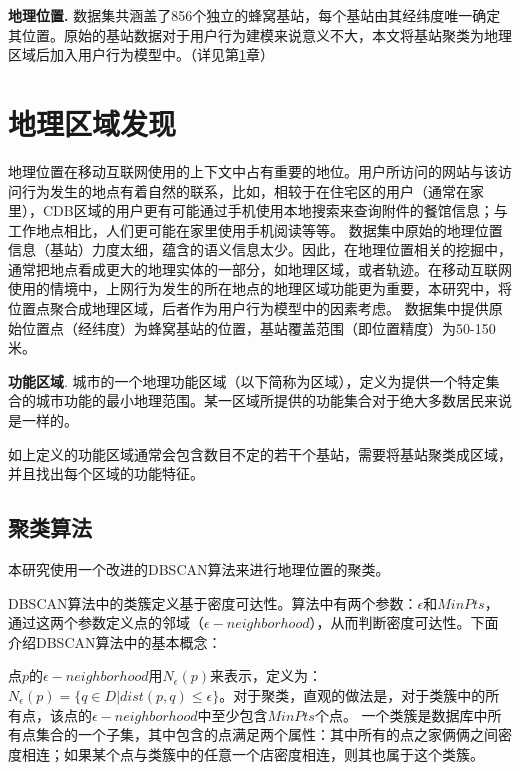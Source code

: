 \textbf{地理位置.} 数据集共涵盖了856个独立的蜂窝基站，每个基站由其经纬度唯一确定其位置。原始的基站数据对于用户行为建模来说意义不大，本文将基站聚类为地理区域后加入用户行为模型中。（详见第\ref{interest:sec:region}章）


\section{地理区域发现}
\label{interest:sec:region}
地理位置在移动互联网使用的上下文中占有重要的地位。用户所访问的网站与该访问行为发生的地点有着自然的联系，比如，相较于在住宅区的用户（通常在家里），CDB区域的用户更有可能通过手机使用本地搜索来查询附件的餐馆信息；与工作地点相比，人们更可能在家里使用手机阅读等等。
数据集中原始的地理位置信息（基站）力度太细，蕴含的语义信息太少。因此，在地理位置相关的挖掘中，通常把地点看成更大的地理实体的一部分，如地理区域\cite{env07park}，或者轨迹\cite{www10zheng}\cite{debu10zheng}。在移动互联网使用的情境中，上网行为发生的所在地点的地理区域功能更为重要，本研究中，将位置点聚合成地理区域，后者作为用户行为模型中的因素考虑。
数据集中提供原始位置点（经纬度）为蜂窝基站的位置，基站覆盖范围（即位置精度）为50-150米。
\begin{definition}
\textbf{功能区域}. 城市的一个地理功能区域（以下简称为区域），定义为提供一个特定集合的城市功能的最小地理范围。某一区域所提供的功能集合对于绝大多数居民来说是一样的。
\end{definition}
如上定义的功能区域通常会包含数目不定的若干个基站，需要将基站聚类成区域，并且找出每个区域的功能特征。
\subsection{聚类算法}
本研究使用一个改进的DBSCAN算法来进行地理位置的聚类。

DBSCAN算法中的类簇定义基于密度可达性。算法中有两个参数：$\epsilon$和$MinPts$，通过这两个参数定义点的邻域（$\epsilon-neighborhood$），从而判断密度可达性。下面介绍DBSCAN算法中的基本概念：

点$p$的$\epsilon-neighborhood$用$N_\epsilon(p)$来表示，定义为：$N_\epsilon (p)=\{q \in D|dist(p,q) \leq \epsilon \}$。对于聚类，直观的做法是，对于类簇中的所有点，该点的$\epsilon-neighborhood$中至少包含$MinPts$个点。
一个类簇是数据库中所有点集合的一个子集，其中包含的点满足两个属性：其中所有的点之家俩俩之间密度相连；如果某个点与类簇中的任意一个店密度相连，则其也属于这个类簇。\cite{ester1996density}

